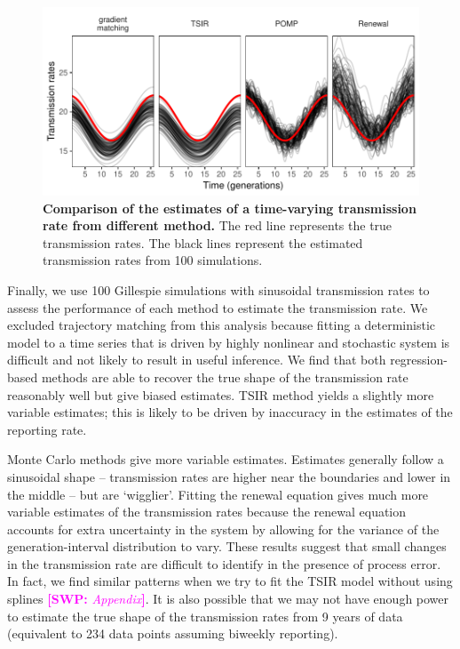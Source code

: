 \documentclass{article}
\newcommand{\comment}[3]{\textcolor{#1}{\textbf{[#2: }\textsl{#3}\textbf{]}}}
\newcommand{\swp}[1]{\comment{magenta}{SWP}{#1}}
\begin{document}
\begin{figure}[!t]
\includegraphics[width=\textwidth]{../figure/compare_transmission.pdf}
\caption{
\textbf{Comparison of the estimates of a time-varying transmission rate from different method.}
The red line represents the true transmission rates.
The black lines represent the estimated transmission rates from 100 simulations.
}
\end{figure}
 
Finally, we use 100 Gillespie simulations with sinusoidal transmission rates to assess the performance of each method to estimate the transmission rate.
We excluded trajectory matching from this analysis because fitting a deterministic model to a time series that is driven by highly nonlinear and stochastic system is difficult and not likely to result in useful inference.
We find that both regression-based methods are able to recover the true shape of the transmission rate reasonably well but give biased estimates.
TSIR method yields a slightly more variable estimates; this is likely to be driven by inaccuracy in the estimates of the reporting rate. 

Monte Carlo methods give more variable estimates.
Estimates generally follow a sinusoidal shape -- transmission rates are higher near the boundaries and lower in the middle -- but are `wigglier'.
Fitting the renewal equation gives much more variable estimates of the transmission rates because the renewal equation accounts for extra uncertainty in the system by allowing for the variance of the generation-interval distribution to vary.
These results suggest that small changes in the transmission rate are difficult to identify in the presence of process error.
In fact, we find similar patterns when we try to fit the TSIR model without using splines \swp{Appendix}.
It is also possible that we may not have enough power to estimate the true shape of the transmission rates from 9 years of data (equivalent to 234 data points assuming biweekly reporting).
\end{document}
